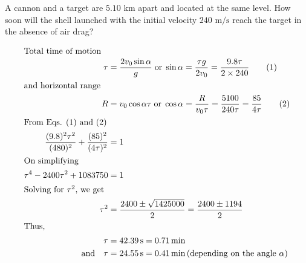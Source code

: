 
\item A cannon and a target are \(5.10 \text{ km}\) apart and located at the same level. How soon will the shell launched with the initial velocity \(240 \text{ m/s}\) reach the target in the absence of air drag?

\begin{solution}
    \begin{center}
    \end{center}
    
    \begin{align*}
        \intertext{Total time of motion}
        \tau &= \dfrac{2v_0\sin\alpha}{g}  \; \text{or} \; \sin\alpha = \dfrac{\tau g}{2v_0} = \dfrac{9.8\tau}{2 \times 240} \tag{1} \\
        \intertext{and horizontal range}
        R &= v_0\cos\alpha\tau  \; \text{or}  \; \cos\alpha = \dfrac{R}{v_0\tau} = \dfrac{5100}{240\tau} = \dfrac{85}{4\tau} \tag{2} \\
        \intertext{From Eqs. (1) and (2)}
        \dfrac{(9.8)^2\tau^2}{(480)^2} + \dfrac{(85)^2}{(4\tau)^2} &= 1 \\
        \intertext{On simplifying}
        \tau^4 - 2400\tau^2 + 1083750 &= 1 \\
        \intertext{Solving for \(\tau^2\), we get}
        \tau^2 &= \dfrac{2400 \pm \sqrt{1425000}}{2} = \dfrac{2400 \pm 1194}{2} \\
        \intertext{Thus,}
        \tau &= 42.39\, \text{s} = 0.71 \, \text{min} \\
        \text{and} \quad \tau &= 24.55\, \text{s} = 0.41 \, \text{min} \, (\text{depending on the angle } \alpha)
    \end{align*}
\end{solution}
